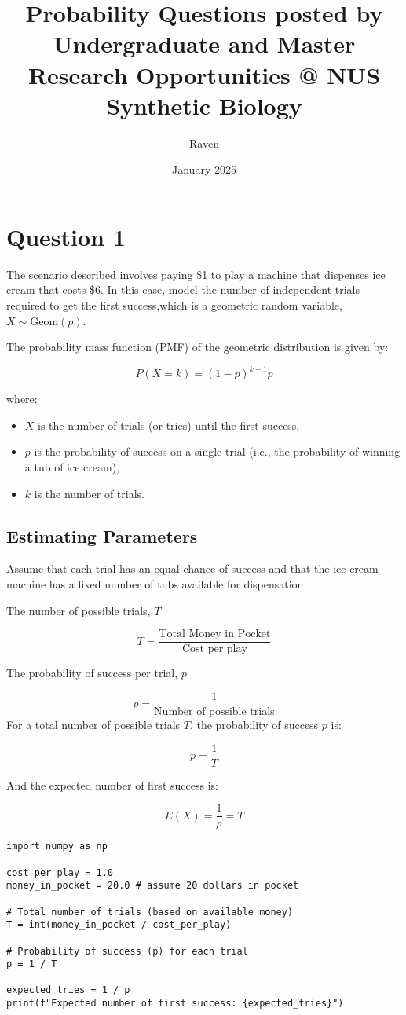 \documentclass{article}
\title{Probability Questions posted by Undergraduate and Master Research Opportunities @ NUS Synthetic Biology}
\author{Raven}
\date{January 2025}
\begin{document}
\maketitle

\section*{Question 1}
The scenario described involves paying \$1 to play a machine that dispenses ice cream that costs \$6. In this case, model the number of independent trials required to get the first success,which is a geometric random variable,$X\sim \text{Geom}(p)$.

The probability mass function (PMF) of the geometric distribution is given by:

\[
P(X = k) = (1 - p)^{k-1} p
\]

where:
\begin{itemize}
    \item \( X \) is the number of trials (or tries) until the first success,
    \item \( p \) is the probability of success on a single trial (i.e., the probability of winning a tub of ice cream),
    \item \( k \) is the number of trials.
\end{itemize}

\subsection*{Estimating Parameters}
Assume that each trial has an equal chance of success and that the ice cream machine has a fixed number of tubs available for dispensation.

The number of possible trials, $T$

\[
T = \frac{\text{Total Money in Pocket}}{\text{Cost per play}}
\]

The probability of success per trial, $p$

\[
p = \frac{1}{\text{Number of possible trials}}
\]
For a total number of possible trials \( T \), the probability of success \( p \) is:

\[
p = \frac{1}{T}
\]

And the expected number of first success is:

\[
E(X) = \frac{1}{p} = {T}
\]

\begin{verbatim}
import numpy as np

cost_per_play = 1.0  
money_in_pocket = 20.0 # assume 20 dollars in pocket

# Total number of trials (based on available money)
T = int(money_in_pocket / cost_per_play) 

# Probability of success (p) for each trial
p = 1 / T 

expected_tries = 1 / p
print(f"Expected number of first success: {expected_tries}")

\end{verbatim}
\end{document}
